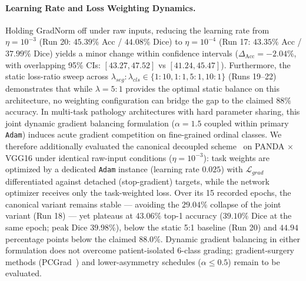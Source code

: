 \documentclass[runningheads]{llncs}
\begin{document}
\paragraph{Learning Rate and Loss Weighting Dynamics.}
Holding GradNorm off under raw inputs, reducing the learning rate from $\eta=10^{-3}$ (Run 20: $45.39\%$ Acc / $44.08\%$ Dice) to $\eta=10^{-4}$ (Run 17: $43.35\%$ Acc / $37.99\%$ Dice) yields a minor change within confidence intervals ($\Delta_{\text{Acc}} = -2.04\%$, with overlapping 95\% CIs: $[43.27, 47.52]$ vs $[41.24, 45.47]$). Furthermore, the static loss-ratio sweep across $\lambda_{seg}:\lambda_{cls} \in \{1{:}10, 1{:}1, 5{:}1, 10{:}1\}$ (Runs 19--22) demonstrates that while $\lambda=5{:}1$ provides the optimal static balance on this architecture, no weighting configuration can bridge the gap to the claimed $88\%$ accuracy. In multi-task pathology architectures with hard parameter sharing, this joint dynamic gradient balancing formulation ($\alpha=1.5$ coupled within primary \texttt{Adam}) induces acute gradient competition on fine-grained ordinal classes. We therefore additionally evaluated the canonical decoupled scheme~\cite{chen2018gradnorm} on PANDA $\times$ VGG16 under identical raw-input conditions ($\eta=10^{-3}$): task weights are optimized by a dedicated \texttt{Adam} instance (learning rate $0.025$) with $\mathcal{L}_{grad}$ differentiated against detached (stop-gradient) targets, while the network optimizer receives only the task-weighted loss. Over its 15 recorded epochs, the canonical variant remains stable --- avoiding the $29.04\%$ collapse of the joint variant (Run 18) --- yet plateaus at $43.06\%$ top-1 accuracy ($39.10\%$ Dice at the same epoch; peak Dice $39.98\%$), below the static 5:1 baseline (Run 20) and $44.94$ percentage points below the claimed $88.0\%$. Dynamic gradient balancing in either formulation does not overcome patient-isolated 6-class grading; gradient-surgery methods (PCGrad~\cite{yu2020pcgrad}) and lower-asymmetry schedules ($\alpha \le 0.5$) remain to be evaluated.
\end{document}
